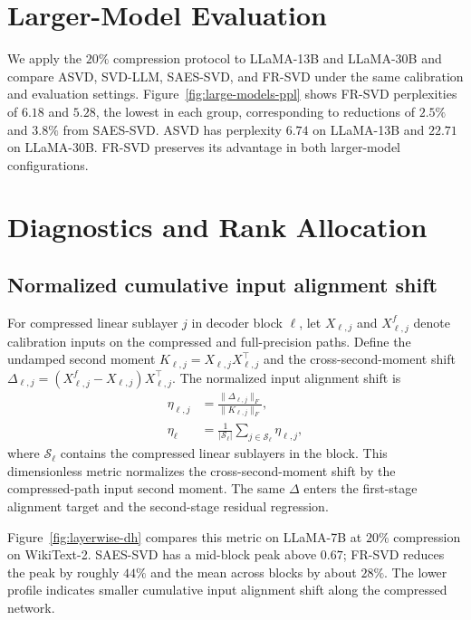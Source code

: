 \section{Larger-Model Evaluation}\label{app:full-results}\label{app:large-models}

We apply the $20\%$ compression protocol to LLaMA-13B and LLaMA-30B and compare ASVD, SVD-LLM, SAES-SVD, and FR-SVD under the same calibration and evaluation settings. Figure~\ref{fig:large-models-ppl} shows FR-SVD perplexities of $6.18$ and $5.28$, the lowest in each group, corresponding to reductions of $2.5\%$ and $3.8\%$ from SAES-SVD. ASVD has perplexity $6.74$ on LLaMA-13B and $22.71$ on LLaMA-30B. FR-SVD preserves its advantage in both larger-model configurations.



\section{Diagnostics and Rank Allocation}\label{app:diagnostics}

\subsection{Normalized cumulative input alignment shift}\label{app:input-shift}
For compressed linear sublayer $j$ in decoder block $\ell$, let $X_{\ell,j}$ and $X_{\ell,j}^f$ denote calibration inputs on the compressed and full-precision paths. Define the undamped second moment $K_{\ell,j}=X_{\ell,j}X_{\ell,j}^\top$ and the cross-second-moment shift $\Delta_{\ell,j}=(X_{\ell,j}^f-X_{\ell,j})X_{\ell,j}^\top$. The normalized input alignment shift is
\begin{equation}
\begin{aligned}
\eta_{\ell,j}&=\frac{\|\Delta_{\ell,j}\|_F}{\|K_{\ell,j}\|_F},\\
\eta_\ell&=\frac1{|\mathcal S_\ell|}\sum_{j\in\mathcal S_\ell}\eta_{\ell,j},
\end{aligned}
\label{eq:app-input-shift}
\end{equation}
where $\mathcal S_\ell$ contains the compressed linear sublayers in the block. This dimensionless metric normalizes the cross-second-moment shift by the compressed-path input second moment. The same $\Delta$ enters the first-stage alignment target and the second-stage residual regression.

Figure~\ref{fig:layerwise-dh} compares this metric on LLaMA-7B at $20\%$ compression on WikiText-2. SAES-SVD has a mid-block peak above $0.67$; FR-SVD reduces the peak by roughly $44\%$ and the mean across blocks by about $28\%$. The lower profile indicates smaller cumulative input alignment shift along the compressed network.

